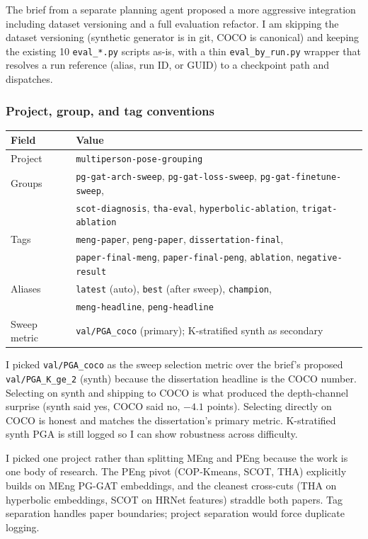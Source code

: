 The brief from a separate planning agent proposed a more aggressive integration including dataset versioning and a full evaluation refactor. I am skipping the dataset versioning (synthetic generator is in git, COCO is canonical) and keeping the existing 10 \texttt{eval\_*.py} scripts as-is, with a thin \texttt{eval\_by\_run.py} wrapper that resolves a run reference (alias, run ID, or GUID) to a checkpoint path and dispatches.

\subsubsection{Project, group, and tag conventions}

\begin{tabular}{ll}
\hline
\textbf{Field} & \textbf{Value} \\
\hline
Project & \texttt{multiperson-pose-grouping} \\
Groups & \texttt{pg-gat-arch-sweep}, \texttt{pg-gat-loss-sweep}, \texttt{pg-gat-finetune-sweep},\\
& \texttt{scot-diagnosis}, \texttt{tha-eval}, \texttt{hyperbolic-ablation}, \texttt{trigat-ablation} \\
Tags & \texttt{meng-paper}, \texttt{peng-paper}, \texttt{dissertation-final}, \\
& \texttt{paper-final-meng}, \texttt{paper-final-peng}, \texttt{ablation}, \texttt{negative-result} \\
Aliases & \texttt{latest} (auto), \texttt{best} (after sweep), \texttt{champion}, \\
& \texttt{meng-headline}, \texttt{peng-headline} \\
Sweep metric & \texttt{val/PGA\_coco} (primary); K-stratified synth as secondary \\
\hline
\end{tabular}

\vspace{0.5em}

I picked \texttt{val/PGA\_coco} as the sweep selection metric over the brief's proposed \texttt{val/PGA\_K\_ge\_2} (synth) because the dissertation headline is the COCO number. Selecting on synth and shipping to COCO is what produced the depth-channel surprise (synth said yes, COCO said no, $-4.1$ points). Selecting directly on COCO is honest and matches the dissertation's primary metric. K-stratified synth PGA is still logged so I can show robustness across difficulty.

I picked one project rather than splitting MEng and PEng because the work is one body of research. The PEng pivot (COP-Kmeans, SCOT, THA) explicitly builds on MEng PG-GAT embeddings, and the cleanest cross-cuts (THA on hyperbolic embeddings, SCOT on HRNet features) straddle both papers. Tag separation handles paper boundaries; project separation would force duplicate logging.


